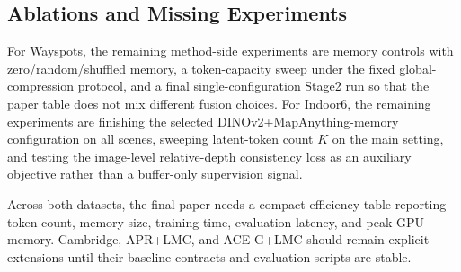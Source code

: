 

\subsection{Ablations and Missing Experiments}

For Wayspots, the remaining method-side experiments are memory controls with zero/random/shuffled memory, a token-capacity sweep under the fixed global-compression protocol, and a final single-configuration Stage2 run so that the paper table does not mix different fusion choices. For Indoor6, the remaining experiments are finishing the selected DINOv2+MapAnything-memory configuration on all scenes, sweeping latent-token count $K$ on the main setting, and testing the image-level relative-depth consistency loss as an auxiliary objective rather than a buffer-only supervision signal.

Across both datasets, the final paper needs a compact efficiency table reporting token count, memory size, training time, evaluation latency, and peak GPU memory. Cambridge, APR+LMC, and ACE-G+LMC should remain explicit extensions until their baseline contracts and evaluation scripts are stable.


